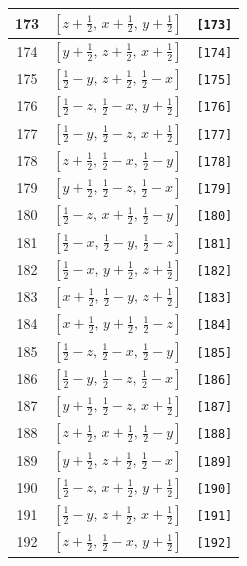 \documentclass[fleqn,8pt]{jsarticle}
\begin{document}
\begin{longtable}{ccc}
173 & $\left[ z + \frac{1}{2},\, x + \frac{1}{2},\, y + \frac{1}{2} \right]$ & {\tt [173]} \\ \hline
174 & $\left[ y + \frac{1}{2},\, z + \frac{1}{2},\, x + \frac{1}{2} \right]$ & {\tt [174]} \\ \hline
175 & $\left[ \frac{1}{2} - y,\, z + \frac{1}{2},\, \frac{1}{2} - x \right]$ & {\tt [175]} \\ \hline
176 & $\left[ \frac{1}{2} - z,\, \frac{1}{2} - x,\, y + \frac{1}{2} \right]$ & {\tt [176]} \\ \hline
177 & $\left[ \frac{1}{2} - y,\, \frac{1}{2} - z,\, x + \frac{1}{2} \right]$ & {\tt [177]} \\ \hline
178 & $\left[ z + \frac{1}{2},\, \frac{1}{2} - x,\, \frac{1}{2} - y \right]$ & {\tt [178]} \\ \hline
179 & $\left[ y + \frac{1}{2},\, \frac{1}{2} - z,\, \frac{1}{2} - x \right]$ & {\tt [179]} \\ \hline
180 & $\left[ \frac{1}{2} - z,\, x + \frac{1}{2},\, \frac{1}{2} - y \right]$ & {\tt [180]} \\ \hline
181 & $\left[ \frac{1}{2} - x,\, \frac{1}{2} - y,\, \frac{1}{2} - z \right]$ & {\tt [181]} \\ \hline
182 & $\left[ \frac{1}{2} - x,\, y + \frac{1}{2},\, z + \frac{1}{2} \right]$ & {\tt [182]} \\ \hline
183 & $\left[ x + \frac{1}{2},\, \frac{1}{2} - y,\, z + \frac{1}{2} \right]$ & {\tt [183]} \\ \hline
184 & $\left[ x + \frac{1}{2},\, y + \frac{1}{2},\, \frac{1}{2} - z \right]$ & {\tt [184]} \\ \hline
185 & $\left[ \frac{1}{2} - z,\, \frac{1}{2} - x,\, \frac{1}{2} - y \right]$ & {\tt [185]} \\ \hline
186 & $\left[ \frac{1}{2} - y,\, \frac{1}{2} - z,\, \frac{1}{2} - x \right]$ & {\tt [186]} \\ \hline
187 & $\left[ y + \frac{1}{2},\, \frac{1}{2} - z,\, x + \frac{1}{2} \right]$ & {\tt [187]} \\ \hline
188 & $\left[ z + \frac{1}{2},\, x + \frac{1}{2},\, \frac{1}{2} - y \right]$ & {\tt [188]} \\ \hline
189 & $\left[ y + \frac{1}{2},\, z + \frac{1}{2},\, \frac{1}{2} - x \right]$ & {\tt [189]} \\ \hline
190 & $\left[ \frac{1}{2} - z,\, x + \frac{1}{2},\, y + \frac{1}{2} \right]$ & {\tt [190]} \\ \hline
191 & $\left[ \frac{1}{2} - y,\, z + \frac{1}{2},\, x + \frac{1}{2} \right]$ & {\tt [191]} \\ \hline
192 & $\left[ z + \frac{1}{2},\, \frac{1}{2} - x,\, y + \frac{1}{2} \right]$ & {\tt [192]} \\
\end{longtable}
\end{document}
